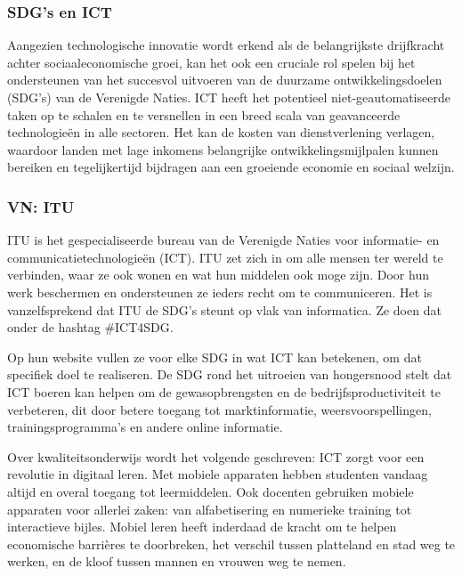 \subsubsection{SDG's en ICT}
Aangezien technologische innovatie wordt erkend als de belangrijkste drijfkracht achter sociaaleconomische groei, kan het ook een cruciale rol spelen bij het ondersteunen van het succesvol uitvoeren van de duurzame ontwikkelingsdoelen (SDG's) van de Verenigde Naties. ICT heeft het potentieel niet-geautomatiseerde taken op te schalen en te versnellen in een breed scala van geavanceerde technologieën in alle sectoren. Het kan de kosten van dienstverlening verlagen, waardoor landen met lage inkomens belangrijke ontwikkelingsmijlpalen kunnen bereiken en tegelijkertijd bijdragen aan een groeiende economie en sociaal welzijn. \autocite{Ameyed2018}

\subsubsection{VN: ITU}
ITU is het gespecialiseerde bureau van de Verenigde Naties voor informatie- en communicatietechnologieën (ICT). ITU zet zich in om alle mensen ter wereld te verbinden, waar ze ook wonen en wat hun middelen ook moge zijn. Door hun werk beschermen en ondersteunen ze ieders recht om te communiceren.
Het is vanzelfsprekend dat ITU de SDG's steunt op vlak van informatica. Ze doen dat onder de hashtag \#ICT4SDG. \autocite{ITU2015}

Op hun website vullen ze voor elke SDG in wat ICT kan betekenen, om dat specifiek doel te realiseren. De SDG rond het uitroeien van hongersnood stelt dat ICT boeren kan helpen om de gewasopbrengsten en de bedrijfsproductiviteit te verbeteren, dit door betere toegang tot marktinformatie, weersvoorspellingen, trainingsprogramma's en andere online informatie. \autocite{ITU2015}

Over kwaliteitsonderwijs wordt het volgende geschreven: ICT zorgt voor een revolutie in digitaal leren. Met mobiele apparaten hebben studenten vandaag altijd en overal toegang tot leermiddelen. Ook docenten gebruiken mobiele apparaten voor allerlei zaken: van alfabetisering en numerieke training tot interactieve bijles. Mobiel leren heeft inderdaad de kracht om te helpen economische barrières te doorbreken, het verschil tussen platteland en stad weg te werken, en de kloof tussen mannen en vrouwen weg te nemen. \autocite{ITU2015}


